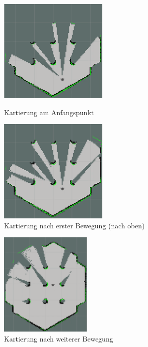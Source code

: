 {{		\begin{figure}[H]
			\begin{minipage}{0.5\textwidth}
				\centering
				\includegraphics[height=5cm]{Bilder/mapping_smpl_1.png}
				\caption{Kartierung am Anfangspunkt}
				\label{pic:mapping_smpl_1}
			\end{minipage}
			\begin{minipage}{0.5\textwidth}
				\centering
				\includegraphics[height=5cm]{Bilder/mapping_smpl_2.png}
				\caption{Kartierung nach erster Bewegung (nach oben)}
				\label{pic:mapping_smpl_2}	
			\end{minipage}
		\end{figure}
		\begin{figure}[H]
			\begin{minipage}{0.5\textwidth}
				\centering
				\includegraphics[height=5cm]{Bilder/mapping_smpl_3.png}
				\caption{Kartierung nach weiterer Bewegung}
				\label{pic:mapping_smpl_3}
			\end{minipage}
			\begin{minipage}{0.5\textwidth}

\end{minipage}
\end{figure}}}
